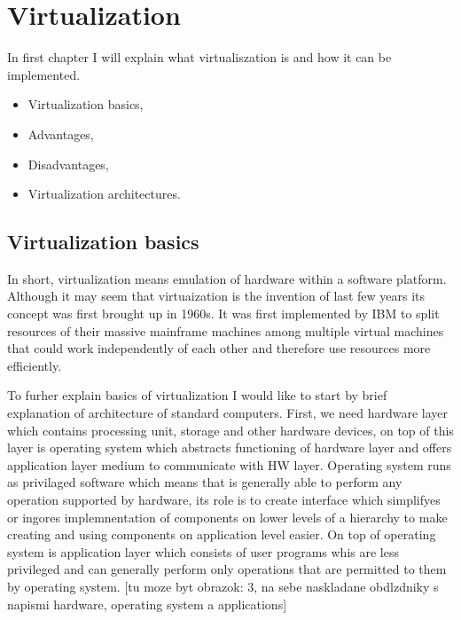 
\chapter{Virtualization}
In first chapter I will explain what virtualiszation is and how it can be implemented.
\begin{itemize}
\item Virtualization basics,
\item Advantages,
\item Disadvantages,
\item Virtualization architectures.
\end{itemize}

\section{Virtualization basics}
In short, virtualization means emulation of hardware within a software platform. Although it may seem that virtuaization is the invention of last few years its concept was first brought up in 1960s. It was first implemented by IBM to split resources of their massive mainframe machines among multiple virtual machines that could work independently of each other and therefore use resources more efficiently.

To furher explain basics of virtualization I would like to start by brief explanation of architecture of standard computers. First, we need hardware layer which contains processing unit, storage and other hardware devices, on top of this layer is operating system which abstracts functioning of hardware layer and offers application layer medium to communicate with HW layer. Operating system runs as privilaged software which means that is generally able to perform any operation supported by hardware, its role is to create interface which simplifyes or ingores implemnentation of components on lower levels of a hierarchy to make creating and using components on application level easier. On top of operating system is application layer which consists of user programs whis are less privileged and can generally perform only operations that are permitted to them by operating system. [tu moze byt obrazok: 3, na sebe naskladane obdlzdniky s napismi hardware, operating system a applications]

